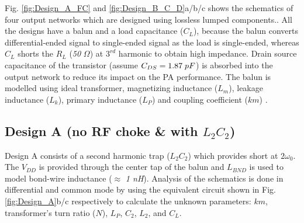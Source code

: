 \documentclass[conference]{IEEEtran}
\begin{document}
Fig. \ref{fig:Design_A_FC} and \ref{fig:Design_B_C_D}a/b/c shows the schematics of four output networks which are designed using lossless lumped components.. 
All the designs have a balun and a load capacitance ($C_L$), because the balun converts differential-ended signal to single-ended signal as the load is single-ended, whereas $C_L$ shorts the $R_L$ (\textit{50} $\Omega$) at $3^{rd}$ harmonic to obtain high impedance. Drain source capacitance of the transistor (assume $C_{DS}=1.87\hspace{1mm}pF$) is absorbed into the output network to reduce its impact on the PA performance. The balun is modelled using ideal transformer, magnetizing inductance ($L_m$), leakage inductance ($L_k$), primary inductance ($L_P$) and coupling coefficient ($km$) \cite{Transformer_model}. 

\subsection{Design A (no RF choke \& with $L_2C_2$)}
Design A consists of a second harmonic trap ($L_2C_2$) which provides short at $2\omega_0$. The $V_{DD}$ is provided through the center tap of the balun and $L_{BND}$ is used to model bond-wire inductance ($\approx$ \textit{1 nH}).
Analysis of the schematics is done in differential and common mode by using the equivalent circuit shown in Fig. \ref{fig:Design_A}b/c respectively to calculate the unknown parameters: $km$, transformer's turn ratio ($N$), $L_P$, $C_2$, $L_2$, and $C_L$.
\end{document}
